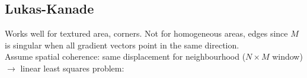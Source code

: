 \subsection*{Lukas-Kanade}
Works well for textured area, corners. Not for homogeneous areas, edges since $M$ is singular when all gradient vectors point in the same direction.\\
Assume spatial coherence: same displacement for neighbourhood ($N \times M$ window) $\rightarrow$ linear least squares problem:
\\
